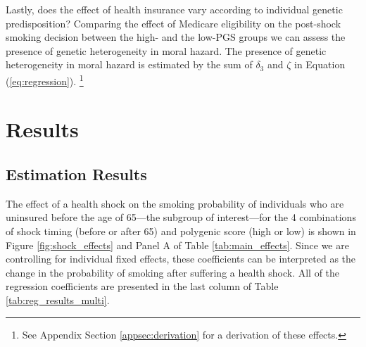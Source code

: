 \documentclass[11pt]{article}
\begin{document}
Lastly, does the effect of health insurance vary according to individual genetic predisposition?
Comparing the effect of Medicare eligibility on the post-shock smoking decision between the high- and the low-PGS groups we can assess the presence of genetic heterogeneity in moral hazard.
The presence of genetic heterogeneity in moral hazard is estimated by the sum of $\delta_3$ and $\zeta$ in Equation (\ref{eq:regression}).%
\footnote{See Appendix Section \ref{appsec:derivation} for a derivation of these effects.}


\section{Results} \label{sec:results}
\subsection{Estimation Results} \label{sec:regs}

The effect of a health shock on the smoking probability of individuals who are uninsured before the age of 65---the subgroup of interest---for the 4 combinations of shock timing (before or after 65) and polygenic score (high or low) is shown in Figure \ref{fig:shock_effects} and Panel A of Table \ref{tab:main_effects}.
Since we are controlling for individual fixed effects, these coefficients can be interpreted as the change in the probability of smoking after suffering a health shock.
All of the regression coefficients are presented in the last column of Table \ref{tab:reg_results_multi}.
\end{document}

